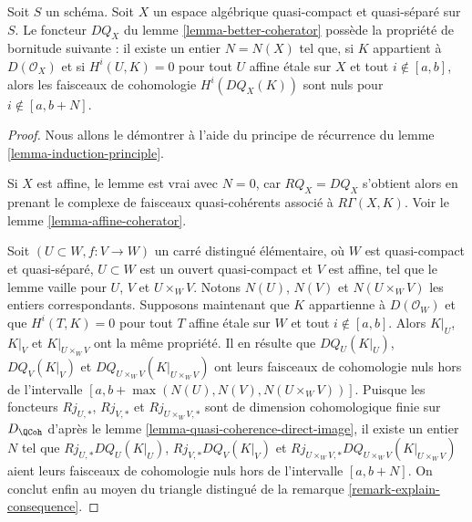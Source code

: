 \begin{lemma}
\label{lemma-boundedness-better-coherator}
Soit $S$ un schéma.
Soit $X$ un espace algébrique quasi-compact et quasi-séparé sur $S$.
Le foncteur $DQ_X$ du lemme \ref{lemma-better-coherator}
possède la propriété de bornitude suivante :
il existe un entier $N = N(X)$ tel que, si
$K$ appartient à $D(\mathcal{O}_X)$ et si
$H^i(U, K) = 0$ pour tout $U$ affine étale sur $X$ et tout $i \not \in [a, b]$, alors
les faisceaux de cohomologie $H^i(DQ_X(K))$ sont nuls pour
$i \not \in [a, b + N]$.
\end{lemma}

\begin{proof}
Nous allons le démontrer à l'aide du principe de récurrence du
lemme \ref{lemma-induction-principle}.

\medskip\noindent
Si $X$ est affine, le lemme est vrai avec $N = 0$, car
$RQ_X = DQ_X$ s'obtient alors en prenant le complexe de
faisceaux quasi-cohérents associé à $R\Gamma(X, K)$.
Voir le lemme \ref{lemma-affine-coherator}.

\medskip\noindent
Soit $(U \subset W, f : V \to W)$ un carré distingué élémentaire,
où $W$ est quasi-compact et quasi-séparé, $U \subset W$
est un ouvert quasi-compact et $V$ est affine, tel que
le lemme vaille pour $U$, $V$ et $U \times_W V$.
Notons $N(U)$, $N(V)$ et $N(U \times_W V)$ les entiers correspondants.
Supposons maintenant que $K$ appartienne à $D(\mathcal{O}_W)$ et que
$H^i(T, K) = 0$ pour tout $T$ affine étale sur $W$ et tout $i \not \in [a, b]$.
Alors $K|_U$, $K|_V$ et $K|_{U \times_W V}$ ont la même propriété.
Il en résulte que $DQ_U(K|_U)$, $DQ_V(K|_V)$ et
$DQ_{U \times_W V}(K|_{U \times_W V})$ ont leurs faisceaux de cohomologie nuls
hors de l'intervalle $[a, b + \max(N(U), N(V), N(U \times_W V))]$.
Puisque les foncteurs $Rj_{U, *}$, $Rj_{V, *}$ et $Rj_{U \times_W V, *}$
sont de dimension cohomologique finie sur $D_\QCoh$ d'après le
lemme \ref{lemma-quasi-coherence-direct-image},
il existe un entier $N$ tel que
$Rj_{U, *}DQ_U(K|_U)$, $Rj_{V, *}DQ_V(K|_V)$ et
$Rj_{U \times_W V, *}DQ_{U \times_W V}(K|_{U \times_W V})$ aient leurs
faisceaux de cohomologie nuls hors de l'intervalle $[a, b + N]$.
On conclut enfin au moyen du triangle distingué de la
remarque \ref{remark-explain-consequence}.
\end{proof}

